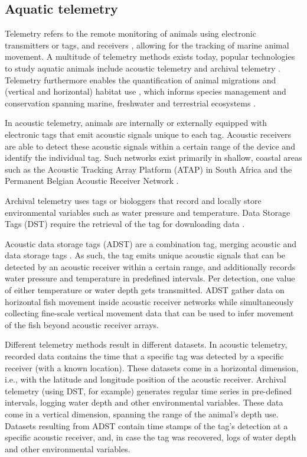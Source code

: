 \documentclass[
  authoryear,
  review,
  3p]{elsarticle}
\begin{document}
\hypertarget{aquatic-telemetry}{%
\subsection{Aquatic telemetry}\label{aquatic-telemetry}}

Telemetry refers to the remote monitoring of animals using electronic
transmitters or tags, and receivers \citep{whoriskey_2019}, allowing for
the tracking of marine animal movement. A multitude of telemetry methods
exists today, popular technologies to study aquatic animals include
acoustic telemetry and archival telemetry \citep{thorstad_2013}.
Telemetry furthermore enables the quantification of animal migrations
and (vertical and horizontal) habitat use \citep{hussey_2015}, which
informs species management and conservation spanning marine, freshwater
and terrestrial ecosystems \citep{beger_2010}.

In acoustic telemetry, animals are internally or externally equipped
with electronic tags that emit acoustic signals unique to each tag.
Acoustic receivers are able to detect these acoustic signals within a
certain range of the device and identify the individual tag. Such
networks exist primarily in shallow, coastal areas \citep{hussey_2015}
such as the Acoustic Tracking Array Platform (ATAP) in South Africa
\citep{cowley_2017} and the Permanent Belgian Acoustic Receiver Network
\citep[PBARN,][]{reubens_2019}.

Archival telemetry uses tags or biologgers that record and locally store
environmental variables such as water pressure and temperature. Data
Storage Tags (DST) require the retrieval of the tag for downloading data
\citep{thorstad_2013}.

Acoustic data storage tags (ADST) are a combination tag, merging
acoustic and data storage tags \citep{goossens_2023}. As such, the tag
emits unique acoustic signals that can be detected by an acoustic
receiver within a certain range, and additionally records water pressure
and temperature in predefined intervals. Per detection, one value of
either temperature or water depth gets transmitted. ADST gather data on
horizontal fish movement inside acoustic receiver networks while
simultaneously collecting fine-scale vertical movement data that can be
used to infer movement of the fish beyond acoustic receiver arrays.

Different telemetry methods result in different datasets. In acoustic
telemetry, recorded data contains the time that a specific tag was
detected by a specific receiver (with a known location). These datasets
come in a horizontal dimension, i.e., with the latitude and longitude
position of the acoustic receiver. Archival telemetry (using DST, for
example) generates regular time series in pre-defined intervals, logging
water depth and other environmental variables. These data come in a
vertical dimension, spanning the range of the animal's depth use.
Datasets resulting from ADST contain time stamps of the tag's detection
at a specific acoustic receiver, and, in case the tag was recovered,
logs of water depth and other environmental variables.
\end{document}
